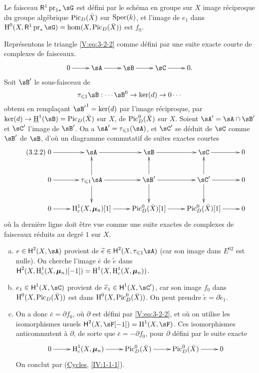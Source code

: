 Le faisceau $\R^1\operatorname{pr}_{1\ast}\sG$ est d\'efini par le sch\'ema en 
groupe sur $X$ image r\'eciproque du groupe alg\'ebrique $\operatorname{Pic}_D(\bar X)$ sur 
$\operatorname{Spec}(k)$, et l'image de $e_1$ dans 
$\h^0(X,\R^1\operatorname{pr}_\ast\sG) = \hom(X,\pic_D(\bar X))$ est $f_0$. 

Repr\'esentons le triangle \eqref{V:eq:3-2-2} comme d\'efini par une suite 
exacte courte de complexes de faisceaux.
\[\xymatrix{
  0 \ar[r] 
    & \sA \ar[r] 
    & \sB \ar[r] 
    & \sC \ar[r] 
    & 0 \text{.}
}\]
Soit $\sB'$ le sous-faisceau de 
\[
  \tau_{\leqslant 1} \sB : \cdots \sB^0 \to \ker(d) \to 0 \cdots
\]
obtenu en remplaçant ${\sB'}^1=\ker(d)$ par l'image r\'eciproque, par 
$\ker(d)\to \underline\h^1(\sB) = \pic_D(\bar X)$ sur $X$, de 
$\operatorname{Pic}_D^0(\bar X)$ sur $X$. Soient $\sA'=\sA\cap \sB'$ et $\sC'$ l'image de 
$\sB'$. On a $\sA'=\tau_{\leqslant 1}(\sA)$, et $\sC'$ se d\'eduit de $\sC$ 
comme $\sB'$ de $\sB$, d'o\`u un diagramme commutatif de suites exactes courtes 
\begin{equation*}\tag{3.2.2}\label{V:eq:3-2-2}
\xymatrix{
  0 \ar[r] 
    & \sA \ar[r] 
    & \sB \ar[r] 
    & \sC \ar[r] 
    & 0 \\
  0 \ar[r] 
    & \tau_{\leqslant 1} \sA \ar[r] \ar[u] \ar[d] 
    & \sB' \ar[r] \ar[u] \ar[d] 
    & \sC' \ar[r] \ar[u] \ar[d] 
    & 0 \\
  0 \ar[r] 
    & \h_c^1(X,\dmu_n)[1] \ar[r] 
    & \pic_D^0(\bar X)[1] \ar[r] 
    & \pic_D^0(\bar X)[1] \ar[r] 
    & 0
}
\end{equation*}
o\`u la derni\`ere ligne doit \^etre vue comme une suite exactes de complexes 
de faisceaux r\'eduits au degr\'e $1$ sur $X$. 
\begin{enumerate}[a)]
  \item $e\in \hh^2(X,\sA)$ provient de 
    $\widetilde e\in \hh^2(X,\tau_{\leqslant 1}\sA)$ (car son image dans 
    $E^{02}$ est nulle). On cherche l'image $\bar e$ de $\widetilde e$ dans 
    $\operatorname{\mathsf{H}}^2(X,\operatorname{H}_c^1(X,{\bm\mu}_n)[-1]) = \operatorname{H}^1(X,\operatorname{H}_c^1(X,{\bm\mu}_n))$.
  \item $e_1\in \hh^1(X,\sC)$ provient de $\widetilde e_1\in \hh^1(X,\sC')$, 
    car son image $f_0$ dans $\operatorname{H}^0(X,\operatorname{Pic}_D(\bar X))$ est dans 
    $\operatorname{H}^0(X,\operatorname{Pic}_D^0(\bar X))$. On peut prendre 
    $\widetilde e=\partial \widetilde e_1$. 
  \item On a donc $\bar e = \partial f_0$, o\`u $\partial $ est d\'efini par 
    \eqref{V:eq:3-2-2}, et o\`u on utilise les isomorphismes usuels 
    $\hh^2(X,\sF[-1]) = \h^1(X,\sF)$. Ces isomorphismes anticommutent \`a 
    $\partial$, de sorte que $\bar e=-\partial f_0$, pour $\partial$ d\'efini 
    par le suite exacte 
    \[\xymatrix{
      0 \ar[r] 
        & \h_c^1(X,\dmu_n) \ar[r] 
        & \pic_D^0(\bar X) \ar[r] 
        & \pic_D^0(\bar X) \ar[r] 
        & 0 
    }\]
    On conclut par (\hyperref[IV]{Cycles}, \ref{IV:1-1-1}). 
\end{enumerate}





